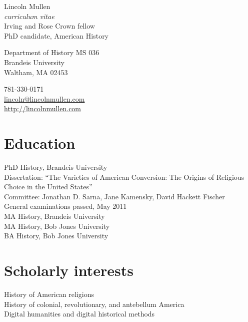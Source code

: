 \documentclass[11pt]{article}
\newcommand{\years}[1]{\marginnote{\scriptsize #1}}
\begin{document}
{\LARGE Lincoln Mullen}\\
\emph{curriculum vitae}\\[1cm]

Irving and Rose Crown fellow\\
PhD candidate, American History

\begin{multicols}{2}
Department of History MS 036\\
Brandeis University\\
Waltham, MA 02453

\columnbreak

781-330-0171\\
\href{mailto:lincoln@lincolnmullen.com}{lincoln@lincolnmullen.com}\\
\href{http://lincolnmullen.com}{http://lincolnmullen.com}
\end{multicols}


\vfill


\section*{Education}
\noindent
\years{2009--}PhD History, Brandeis University\\[.05cm]
	Dissertation: ``The Varieties of American Conversion: The Origins of Religious Choice in the United States''\\
	Committee:  Jonathan D. Sarna, Jane Kamensky, David Hackett Fischer\\
	General examinations passed, May 2011\\[.2cm]
\years{2011}MA History, Brandeis University\\
\years{2008}MA History, Bob Jones University\\
\years{2006}BA History, Bob Jones University

\section*{Scholarly interests}
History of American religions\\
History of colonial, revolutionary, and antebellum America\\
Digital humanities and digital historical methods

\end{document}
